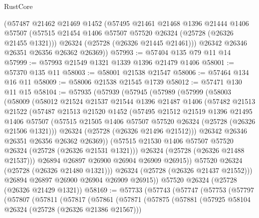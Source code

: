 \begin{lexlean}{RustCore}
\begin{coremodule}
      (@57487
        @21462
        @21469
        @1452
        (@57495
          @21461
          @21468
          @1396
          @21444
          @1406
          @57507
          (@57515 @21454 @1406 @57507 @57520 @26324 (@25728 (@26326 @21455 @1321)))
          @26324
          (@25728 (@26326 @21445 @21461)))
        @26342
        @26346
        @26351
        @26356
        @26362
        @26369))
@57993 := @57404 @135 @79 @11 @14
@57999 := @57993 @21549 @1321 @1339 @1396 @21479 @1406
@58001 := @57370 @135 @11
@58003 := @58001 @21538 @21547
@58006 := @57464 @134 @16 @11
@58009 := @58006 @21538 @21545 @1739
@58012 := @57471 @130 @11 @15
@58104 := @57935
    (@57939
      (@57945
        (@57989
          (@57999
            (@58003
              (@58009
                (@58012
                  @21524
                  @21537
                  @21544
                  @1396
                  @21487
                  @1406
                  (@57482
                    @21513
                    @21522
                    (@57487
                      @21513
                      @21520
                      @1452
                      (@57495
                        @21512
                        @21519
                        @1396
                        @21495
                        @1406
                        @57507
                        (@57515 @21505 @1406 @57507 @57520 @26324 (@25728 (@26326 @21506 @1321)))
                        @26324
                        (@25728 (@26326 @21496 @21512)))
                      @26342
                      @26346
                      @26351
                      @26356
                      @26362
                      @26369))
                  (@57515 @21530 @1406 @57507 @57520 @26324 (@25728 (@26326 @21531 @1321)))
                  @26324
                  (@25728 (@26326 @21488 @21537)))
                @26894
                @26897
                @26900
                @26904
                @26909
                @26915))
            @57520
            @26324
            (@25728 (@26326 @21480 @1321)))
          @26324
          (@25728 (@26326 @21437 @21552)))
        @26894
        @26897
        @26900
        @26904
        @26909
        @26915))
    @57520
    @26324
    (@25728 (@26326 @21429 @1321))
@58169 := @57733
    (@57743
      (@57747
        (@57753
          (@57797
            (@57807
              (@57811
                (@57817
                  (@57861
                    (@57871
                      (@57875
                        (@57881
                          (@57925 @58104 @26324 (@25728 (@26326 @21386 @21567)))

\end{coremodule}
\end{lexlean}
